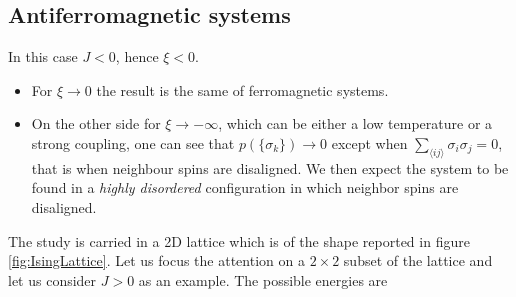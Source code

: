 \subsection{Antiferromagnetic systems}
\label{subsec:antiferromagnetic}
In this case $J < 0$, hence $\xi < 0$. 
\begin{itemize}
    \item For $\xi \to 0$ the result is the same of ferromagnetic systems.
    \item On the other side for $\xi \to -\infty$, which can be either a low temperature or a strong coupling, one can see that 
    $p(\{\sigma_k\}) \to 0$ except when $\sum_{\langle i j\rangle}\sigma_{i} \sigma_{j} = 0$, that is when neighbour spins are disaligned. We then expect the system to be found in a \emph{highly disordered} configuration in which 
    neighbor spins are disaligned.
\end{itemize}
The study is carried in a 2D lattice which is of the shape reported in figure \ref{fig:IsingLattice}.
Let us focus the attention on a $2\times2$ subset of the lattice and let us consider $J>0$ as an example. The possible energies are 
